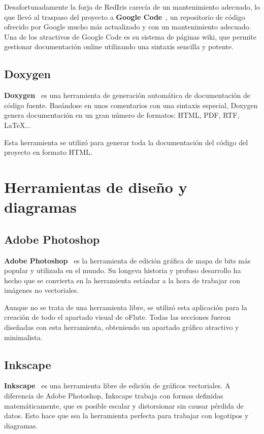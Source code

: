 Desafortunadamente la forja de RedIris carecía de un mantenimiento adecuado, lo
que llevó al traspaso del proyecto a \textbf{Google Code}~\cite{ofluteforja}, un
repositorio de código ofrecido por Google mucho más actualizado y con un
mantenimiento adecuado. Una de los atractivos de Google Code es su sistema de
páginas wiki, que permite gestionar documentación online utilizando una sintaxis
sencilla y potente.

\subsection{Doxygen}
\textbf{Doxygen}~\cite{doxygen} es una herramienta de generación automática de
documentación de código fuente. Basándose en unos comentarios con una sintaxis
especial, Doxygen genera documentación en un gran número de formatos: HTML, PDF,
RTF, \LaTeX...

Esta herramienta se utilizó para generar toda la documentación del código del
proyecto en formato HTML.


\section{Herramientas de diseño y diagramas}

\subsection{Adobe Photoshop}
\textbf{Adobe Photoshop}~\cite{photoshop} es la herramienta de edición gráfica de mapa de bits
más popular y utilizada en el mundo. Su longeva historia y profuso desarrollo ha
hecho que se convierta en la herramienta estándar a la hora de trabajar con
imágenes no vectoriales.

Aunque no se trata de una herramienta libre, se utilizó esta aplicación para la
creación de todo el apartado visual de oFlute. Todas las secciones fueron
diseñadas con esta herramienta, obteniendo un apartado gráfico atractivo y
minimalista.

\subsection{Inkscape}
\textbf{Inkscape}~\cite{inkscape} es una herramienta libre de edición de gráficos vectoriales. A
diferencia de Adobe Photoshop, Inkscape trabaja con formas definidas
matemáticamente, que es posible escalar y distorsionar sin causar pérdida de
datos. Esto hace que sea la herramienta perfecta para trabajar con logotipos y
diagramas.

